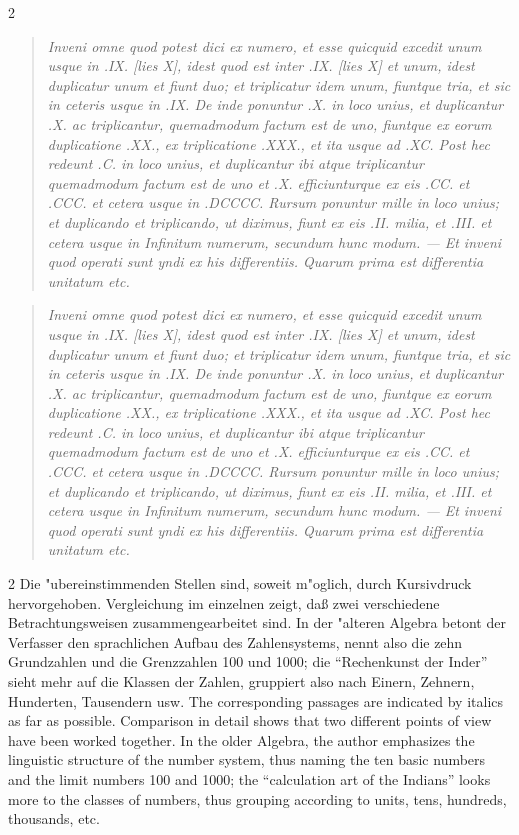 \documentclass[10pt,a4paper]{article}
\renewcommand{\switchcolumn}{\syncronize\nointerlineskip\columnbreak}
\newcommand{\enquote}[1]{``#1''}
\begin{document}
\begin{paracol}{2}
\begin{quote}
\textit{Inveni omne quod potest dici ex numero, et esse quicquid excedit unum usque in .IX. [lies X], idest quod est inter .IX. [lies X] et unum, idest duplicatur unum et fiunt duo; et triplicatur idem unum, fiuntque tria, et sic in ceteris usque in .IX. De inde ponuntur .X. in loco unius, et duplicantur .X. ac triplicantur, quemadmodum factum est de uno, fiuntque ex eorum duplicatione .XX., ex triplicatione .XXX., et ita usque ad .XC. Post hec redeunt .C. in loco unius, et duplicantur ibi atque triplicantur quemadmodum factum est de uno et .X. efficiunturque ex eis .CC. et .CCC. et cetera usque in .DCCCC. Rursum ponuntur mille in loco unius; et duplicando et triplicando, ut diximus, fiunt ex eis .II. milia, et .III. et cetera usque in Infinitum numerum, secundum hunc modum. --- Et inveni quod operati sunt yndi ex his differentiis. Quarum prima est differentia unitatum etc.}
\end{quote}
\switchcolumn
\begin{quote}
\textit{Inveni omne quod potest dici ex numero, et esse quicquid excedit unum usque in .IX. [lies X], idest quod est inter .IX. [lies X] et unum, idest duplicatur unum et fiunt duo; et triplicatur idem unum, fiuntque tria, et sic in ceteris usque in .IX. De inde ponuntur .X. in loco unius, et duplicantur .X. ac triplicantur, quemadmodum factum est de uno, fiuntque ex eorum duplicatione .XX., ex triplicatione .XXX., et ita usque ad .XC. Post hec redeunt .C. in loco unius, et duplicantur ibi atque triplicantur quemadmodum factum est de uno et .X. efficiunturque ex eis .CC. et .CCC. et cetera usque in .DCCCC. Rursum ponuntur mille in loco unius; et duplicando et triplicando, ut diximus, fiunt ex eis .II. milia, et .III. et cetera usque in Infinitum numerum, secundum hunc modum. --- Et inveni quod operati sunt yndi ex his differentiis. Quarum prima est differentia unitatum etc.}
\end{quote}
\end{paracol}

\begin{paracol}{2}
Die "ubereinstimmenden Stellen sind, soweit m"oglich, durch Kursivdruck hervorgehoben. Vergleichung im einzelnen zeigt, da\ss{} zwei verschiedene Betrachtungsweisen zusammengearbeitet sind. In der "alteren Algebra betont der Verfasser den sprachlichen Aufbau des Zahlensystems, nennt also die zehn Grundzahlen und die Grenzzahlen 100 und 1000; die \enquote{Rechenkunst der Inder} sieht mehr auf die Klassen der Zahlen, gruppiert also nach Einern, Zehnern, Hunderten, Tausendern usw.
\switchcolumn
The corresponding passages are indicated by italics as far as possible. Comparison in detail shows that two different points of view have been worked together. In the older Algebra, the author emphasizes the linguistic structure of the number system, thus naming the ten basic numbers and the limit numbers 100 and 1000; the ``calculation art of the Indians'' looks more to the classes of numbers, thus grouping according to units, tens, hundreds, thousands, etc.
\end{paracol}
\end{document}
